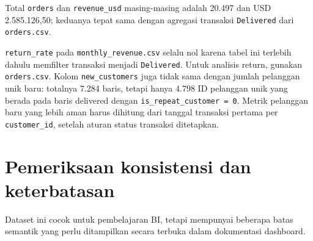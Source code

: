 \documentclass[
  indonesian,
  letterpaper,
  DIV=11,
  numbers=noendperiod]{scrreprt}
\begin{document}
Total \texttt{orders} dan \texttt{revenue\_usd} masing-masing adalah
20.497 dan USD 2.585.126,50; keduanya tepat sama dengan agregasi
transaksi \texttt{Delivered} dari \texttt{orders.csv}.

\begin{tcolorbox}[enhanced jigsaw, arc=.35mm, bottomrule=.15mm, bottomtitle=1mm, breakable, colback=white, colbacktitle=quarto-callout-warning-color!10!white, colframe=quarto-callout-warning-color-frame, coltitle=black, left=2mm, leftrule=.75mm, opacityback=0, opacitybacktitle=0.6, rightrule=.15mm, title=\textcolor{quarto-callout-warning-color}{\faExclamationTriangle}\hspace{0.5em}{Definisi agregat harus dibaca sebelum digunakan}, titlerule=0mm, toprule=.15mm, toptitle=1mm]

\texttt{return\_rate} pada \texttt{monthly\_revenue.csv} selalu nol
karena tabel ini terlebih dahulu memfilter transaksi menjadi
\texttt{Delivered}. Untuk analisis return, gunakan \texttt{orders.csv}.
Kolom \texttt{new\_customers} juga tidak sama dengan jumlah pelanggan
unik baru: totalnya 7.284 baris, tetapi hanya 4.798 ID pelanggan unik
yang berada pada baris delivered dengan
\texttt{is\_repeat\_customer\ =\ 0}. Metrik pelanggan baru yang lebih
aman harus dihitung dari tanggal transaksi pertama per
\texttt{customer\_id}, setelah aturan status transaksi ditetapkan.

\end{tcolorbox}

\section*{Pemeriksaan konsistensi dan
keterbatasan}\label{pemeriksaan-konsistensi-dan-keterbatasan}


Dataset ini cocok untuk pembelajaran BI, tetapi mempunyai beberapa batas
semantik yang perlu ditampilkan secara terbuka dalam dokumentasi
dashboard.
\end{document}
